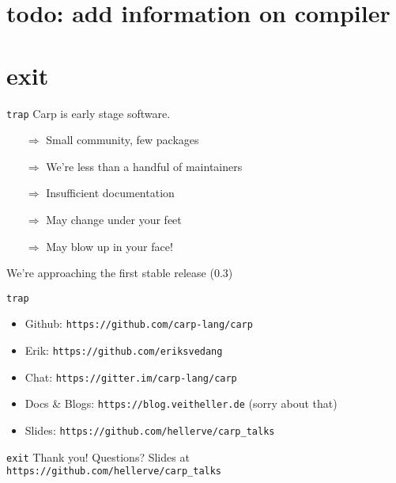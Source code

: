 \documentclass[aspectratio=169]{beamer}
\begin{document}
  \section{todo: add information on compiler}
  \section{exit}
  \begin{frame}{\texttt{trap}}
    Carp is early stage software.
    \begin{itemize}
      \item[$\Rightarrow$] Small community, few packages
      \item[$\Rightarrow$] We’re less than a handful of maintainers
      \item[$\Rightarrow$] Insufficient documentation
      \item[$\Rightarrow$] May change under your feet
      \item[$\Rightarrow$] May blow up in your face!
    \end{itemize}
    We’re approaching the first stable release (0.3)
  \end{frame}
  \begin{frame}{\texttt{trap}}
    \begin{itemize}
      \item Github: \texttt{https://github.com/carp-lang/carp}
      \item Erik: \texttt{https://github.com/eriksvedang}
      \item Chat: \texttt{https://gitter.im/carp-lang/carp}
      \item Docs \& Blogs: \texttt{https://blog.veitheller.de} (sorry about that)
      \item Slides: \texttt{https://github.com/hellerve/carp\_talks}
    \end{itemize}
  \end{frame}
  \begin{frame}{\texttt{exit}}
    \Huge Thank you!
    \linebreak
    \linebreak
    \linebreak
    \small Questions?
    \linebreak
    \linebreak
    \tiny Slides at \texttt{https://github.com/hellerve/carp\_talks}
  \end{frame}
\end{document}
